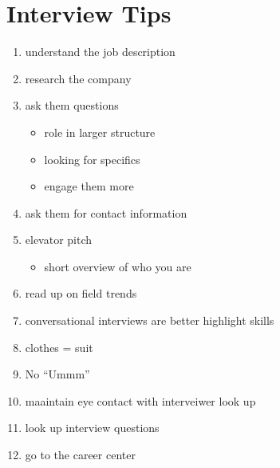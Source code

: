 \documentclass[10pt]{article}
\begin{document}
\section*{Interview Tips}
\begin{enumerate}
    \item understand the job description
    \item research the company
    \item ask them questions
    \begin{itemize}
        \item role in larger structure
        \item looking for specifics
        \item engage them more
    \end{itemize}
    \item ask them for contact information
    \item elevator pitch
    \begin{itemize}
        \item short overview of who you are
    \end{itemize}
    \item read up on field \textrightarrow  trends
    \item conversational interviews are better \textrightarrow  highlight skills
    \item clothes = suit
    \item No ``Ummm''
    \item maaintain eye contact with interveiwer \textrightarrow  look up
    \item look up interview questions
    \item go to the career center
\end{enumerate}
\end{document}
